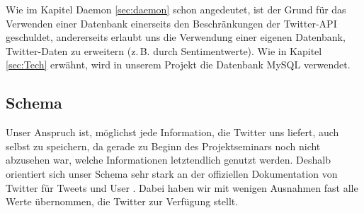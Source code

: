 Wie im Kapitel Daemon \ref{sec:daemon} schon angedeutet, ist der Grund für das Verwenden einer Datenbank einerseits den Beschränkungen der Twitter-API geschuldet, andererseits erlaubt uns die Verwendung einer eigenen Datenbank, Twitter-Daten zu erweitern (z.\,B. durch Sentimentwerte).
Wie in Kapitel \ref{sec:Tech} erwähnt, wird in unserem Projekt die Datenbank MySQL verwendet.


\subsection{Schema} %
Unser Anspruch ist, möglichst jede Information, die Twitter uns liefert, auch selbst zu speichern, da gerade zu Beginn des Projektseminars noch nicht abzusehen war, welche Informationen letztendlich genutzt werden.
Deshalb orientiert sich unser Schema sehr stark an der offiziellen Dokumentation von Twitter für Tweets \cite{TwitterTweets} und User \cite{TwitterUsers}. 
Dabei haben wir mit wenigen Ausnahmen fast alle Werte übernommen, die Twitter zur Verfügung stellt.

